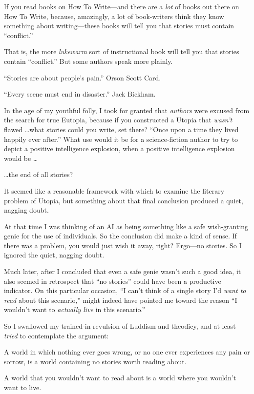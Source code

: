 {
 If you read books on How To Write---and there are a \textit{lot}
of books out there on How To Write, because, amazingly, a lot of
book-writers think they know something about writing---these books will
tell you that stories must contain
``conflict.''}

{
 That is, the more \textit{lukewarm} sort of instructional book
will tell you that stories contain
``conflict.'' But some authors speak
more plainly.}

{
 ``Stories are about people's
pain.'' Orson Scott Card.}

{
 ``Every scene must end in
disaster.'' Jack Bickham.}

{
 In the age of my youthful folly, I took for granted that
\textit{authors} were excused from the search for true Eutopia, because
if you constructed a Utopia that \textit{wasn't} flawed
\ldots what stories could you write, set there? ``Once
upon a time they lived happily ever after.'' What use
would it be for a science-fiction author to try to depict a positive
intelligence explosion, when a positive intelligence explosion would be
\ldots}

{
 \ldots the end of all stories?}

{
 It seemed like a reasonable framework with which to examine the
literary problem of Utopia, but something about that final conclusion
produced a quiet, nagging doubt.}

{
 At that time I was thinking of an AI as being something like a
safe wish-granting genie for the use of individuals. So the conclusion
did make a kind of sense. If there was a problem, you would just wish
it away, right? Ergo---no stories. So I ignored the quiet, nagging
doubt.}

{
 Much later, after I concluded that even a safe genie
wasn't such a good idea, it also seemed in retrospect
that ``no stories'' could have been
a productive indicator. On this particular occasion,
``I can't think of a single story
I'd \textit{want to read} about this
scenario,'' might indeed have pointed me toward the
reason ``I wouldn't want to
\textit{actually live} in this scenario.''}

{
 So I swallowed my trained-in revulsion of Luddism and theodicy,
and at least \textit{tried} to contemplate the argument:}

{
 A world in which nothing ever goes wrong, or no one ever
experiences any pain or sorrow, is a world containing no stories worth
reading about.}

{
 A world that you wouldn't want to read about is a
world where you wouldn't want to live.}


